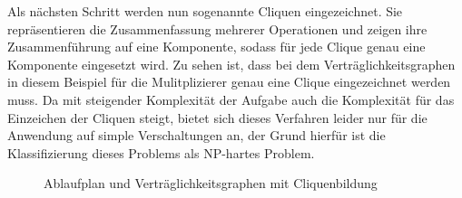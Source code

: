 \documentclass[conference]{IEEEtran}
\begin{document}
Als nächsten Schritt werden nun sogenannte Cliquen eingezeichnet. Sie repräsentieren die Zusammenfassung mehrerer Operationen und zeigen ihre Zusammenführung auf eine Komponente, sodass für jede Clique genau eine Komponente eingesetzt wird. Zu sehen ist, dass bei dem Verträglichkeitsgraphen in diesem Beispiel für die Mulitplizierer genau eine Clique eingezeichnet werden muss. Da mit steigender Komplexität der Aufgabe auch die Komplexität für das Einzeichen der Cliquen steigt, bietet sich dieses Verfahren leider nur für die Anwendung auf simple Verschaltungen an, der Grund hierfür ist die Klassifizierung dieses Problems als NP-hartes Problem.\cite[S.361]{2}\\
\begin{figure}[h]
\caption{Ablaufplan und Verträglichkeitsgraphen mit Cliquenbildung}
\label{fig.3}
\end{figure}


\end{document}
